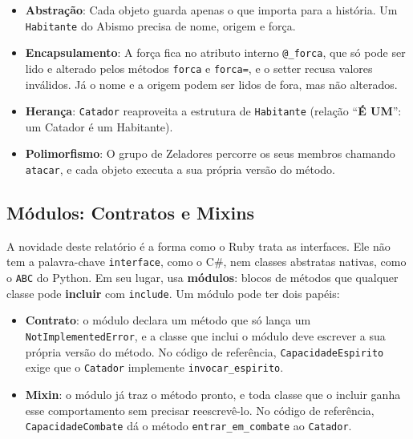 \begin{itemize}
    \item \textbf{Abstração}: Cada objeto guarda apenas o que importa para a história. Um
    \texttt{Habitante} do Abismo precisa de nome, origem e força.

    \item \textbf{Encapsulamento}: A força fica no atributo interno \texttt{@\_forca}, que só
    pode ser lido e alterado pelos métodos \texttt{forca} e \texttt{forca=}, e o setter recusa
    valores inválidos. Já o nome e a origem podem ser lidos de fora, mas não alterados.

    \item \textbf{Herança}: \texttt{Catador} reaproveita a estrutura de \texttt{Habitante}
    (relação ``\textbf{É UM}'': um Catador é um Habitante).

    \item \textbf{Polimorfismo}: O grupo de Zeladores percorre os seus membros chamando
    \texttt{atacar}, e cada objeto executa a sua própria versão do método.
\end{itemize}

\subsection{Módulos: Contratos e Mixins}

A novidade deste relatório é a forma como o Ruby trata as interfaces. Ele não tem a
palavra-chave \texttt{interface}, como o C\#, nem classes abstratas nativas, como o \texttt{ABC}
do Python. Em seu lugar, usa \textbf{módulos}: blocos de métodos que qualquer classe pode
\textbf{incluir} com \texttt{include}. Um módulo pode ter dois papéis:

\begin{itemize}
    \item \textbf{Contrato}: o módulo declara um método que só lança um
    \texttt{NotImplementedError}, e a classe que inclui o módulo deve escrever a sua própria
    versão do método. No código de referência, \texttt{CapacidadeEspirito} exige que o
    \texttt{Catador} implemente \texttt{invocar\_espirito}.

    \item \textbf{Mixin}: o módulo já traz o método pronto, e toda classe que o incluir ganha
    esse comportamento sem precisar reescrevê-lo. No código de referência,
    \texttt{CapacidadeCombate} dá o método \texttt{entrar\_em\_combate} ao \texttt{Catador}.
\end{itemize}


